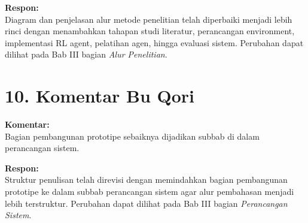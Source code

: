 \textbf{Respon:} \\
Diagram dan penjelasan alur metode penelitian telah diperbaiki menjadi lebih rinci dengan menambahkan tahapan studi literatur, perancangan environment, implementasi RL agent, pelatihan agen, hingga evaluasi sistem. Perubahan dapat dilihat pada Bab III bagian \textit{Alur Penelitian}.

\vspace{0.5cm}

\section*{10. Komentar Bu Qori}
\textbf{Komentar:} \\
Bagian pembangunan prototipe sebaiknya dijadikan subbab di dalam perancangan sistem.

\textbf{Respon:} \\
Struktur penulisan telah direvisi dengan memindahkan bagian pembangunan prototipe ke dalam subbab perancangan sistem agar alur pembahasan menjadi lebih terstruktur. Perubahan dapat dilihat pada Bab III bagian \textit{Perancangan Sistem}.

\vspace{0.5cm}


